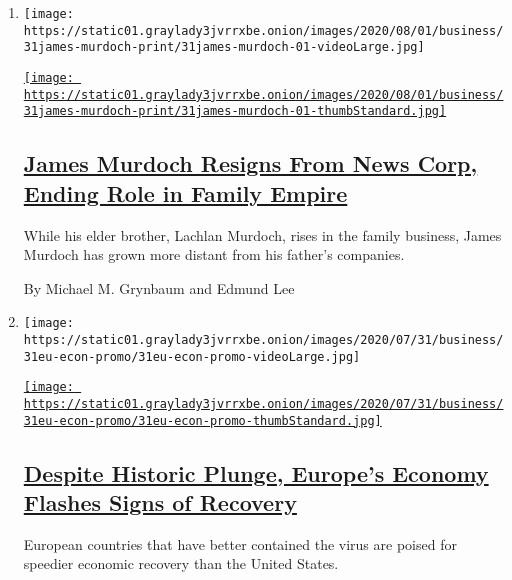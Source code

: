 \begin{enumerate}
\def\labelenumi{\arabic{enumi}.}
\item
  \texttt{[image: https://static01.graylady3jvrrxbe.onion/images/2020/08/01/business/31james-murdoch-print/31james-murdoch-01-videoLarge.jpg]}

  \href{/2020/07/31/business/media/james-murdoch-resigns-news-corp.html}{\texttt{[image: https://static01.graylady3jvrrxbe.onion/images/2020/08/01/business/31james-murdoch-print/31james-murdoch-01-thumbStandard.jpg]}}

  \hypertarget{james-murdoch-resigns-from-news-corp-ending-role-in-family-empire}{%
  \subsection{\texorpdfstring{\href{/2020/07/31/business/media/james-murdoch-resigns-news-corp.html}{James
  Murdoch Resigns From News Corp, Ending Role in Family
  Empire}}{James Murdoch Resigns From News Corp, Ending Role in Family Empire}}\label{james-murdoch-resigns-from-news-corp-ending-role-in-family-empire}}

  While his elder brother, Lachlan Murdoch, rises in the family
  business, James Murdoch has grown more distant from his father's
  companies.

  By Michael M. Grynbaum and Edmund Lee
\item
  \texttt{[image: https://static01.graylady3jvrrxbe.onion/images/2020/07/31/business/31eu-econ-promo/31eu-econ-promo-videoLarge.jpg]}

  \href{/2020/07/31/business/europe-economy-recovery-coronavirus.html}{\texttt{[image: https://static01.graylady3jvrrxbe.onion/images/2020/07/31/business/31eu-econ-promo/31eu-econ-promo-thumbStandard.jpg]}}

  \hypertarget{despite-historic-plunge-europes-economy-flashes-signs-of-recovery}{%
  \subsection{\texorpdfstring{\href{/2020/07/31/business/europe-economy-recovery-coronavirus.html}{Despite
  Historic Plunge, Europe's Economy Flashes Signs of
  Recovery}}{Despite Historic Plunge, Europe's Economy Flashes Signs of Recovery}}\label{despite-historic-plunge-europes-economy-flashes-signs-of-recovery}}

  European countries that have better contained the virus are poised for
  speedier economic recovery than the United States.


\end{enumerate}
